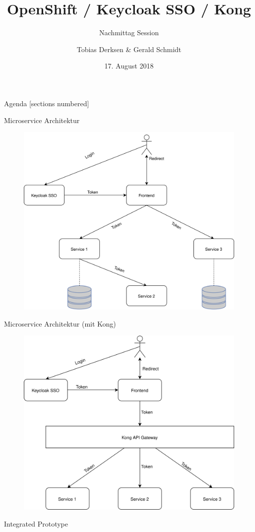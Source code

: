 \documentclass[aspectratio=169]{beamer}
\title{OpenShift / Keycloak SSO / Kong}
\subtitle{Nachmittag Session}
\date{17. August 2018}
\author{Tobias Derksen \& Gerald Schmidt}
\institute{codecentric AG / Berlin}
\begin{document}
\maketitle

\begin{frame}{Agenda}
	[sections numbered]
	\tableofcontents[hideallsubsections]
\end{frame}






\begin{frame}{Microservice Architektur}
	\begin{figure}
		\centering
		\includegraphics[height=0.85\textheight]{img/setup_basic}
	\end{figure}
\end{frame}


\begin{frame}{Microservice Architektur (mit Kong)}
	\begin{figure}
		\centering
		\includegraphics[height=0.85\textheight]{img/setup_kong}
	\end{figure}
\end{frame}


\begin{frame}[standout]
Integrated Prototype
\end{frame}



\end{document}
